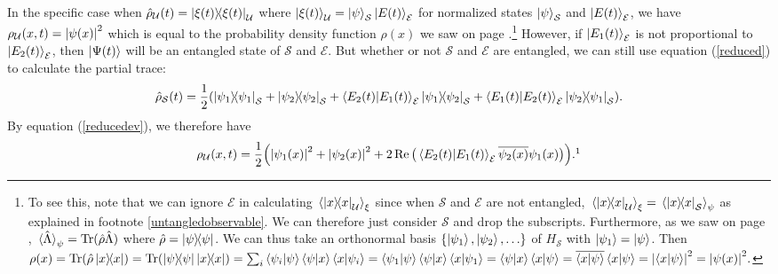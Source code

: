      In the specific case when $\hat{\rho}_\mathcal{U}(t)=\dyad{\xi(t)}_\mathcal{U}$ where $\ket{\xi(t)}_\mathcal{U}=\ket{\psi}_\mathcal{S}\ket{E(t)}_\mathcal{E}$ for normalized states $\ket{\psi}_\mathcal{S}$ and $\ket{E(t)}_\mathcal{E}$, we have $\rho_\mathcal{U}(x, t) =\abs{\psi(x)}^2$ which is equal to the probability density function $\rho(x)$ we saw on page \pageref{rhodensity}.\footnote{To see this, note that we can ignore $\mathcal{E}$ in calculating $\ev*{\dyad{x}_\mathcal{U}}_\xi$ since when $\mathcal{S}$ and $\mathcal{E}$ are not entangled, $\ev*{\dyad{x}_\mathcal{U}}_\xi = \ev*{\dyad{x}_\mathcal{S}}_\psi$ as explained in footnote \ref{untangledobservable}. We can therefore just consider $\mathcal{S}$ and drop the subscripts.
    Furthermore, as we saw on page \pageref{traceev}, $\ev*{\hat{\Lambda}}_\psi=\Tr(\hat{\rho}\hat{\Lambda})$ where $\hat{\rho}=\dyad{\psi}$. 
    We can thus take an orthonormal basis $\{\ket{\psi_1},\ket{\psi_2},\ldots\}$ of $H_\mathcal{S}$ with $\ket{\psi_1}=\ket{\psi}$. 
    Then $\rho(x)=\Tr(\hat{\rho}\dyad{x})=\Tr(\dyad{\psi}\dyad{x})=\sum_i\ip{\psi_i}{\psi}\ip{\psi}{x}\ip{x}{\psi_i}=\ip{\psi_1}{\psi}\ip{\psi}{x}\ip{x}{\psi_1} =\ip{\psi}{x}\ip{x}{\psi}=\overline{\ip{x}{\psi}}\ip{x}{\psi}=\abs{\ip{x}{\psi}}^2=\abs{\psi(x)}^2.$} 
    However, if $\ket{E_1(t)}_\mathcal{E}$ is not proportional to $\ket{E_2(t)}_\mathcal{E}$, then $\ket{\Psi(t)}$ will be an entangled state of $\mathcal{S}$ and $\mathcal{E}$. But whether or not $\mathcal{S}$ and $\mathcal{E}$ are entangled, we can still use equation (\ref{reduced}) to calculate the partial trace:
    $$\hat{\rho}_\mathcal{S}(t)=\frac{1}{2}(\dyad{\psi_1}_\mathcal{S}+\dyad{\psi_2}_\mathcal{S}+\ip{E_2(t)}{E_1(t)}_\mathcal{E} \dyad{\psi_1}{\psi_2}_\mathcal{S}+\ip{E_1(t)}{E_2(t)}_\mathcal{E} \dyad{\psi_2}{\psi_1}_\mathcal{S}).$$
    By equation (\ref{reducedev}), we therefore have
    \begin{equation}\rho_\mathcal{U}(x, t)=\frac{1}{2}\Big(\abs{\psi_1(x)}^2+\abs{\psi_2(x)}^2+2\Re\big(\ip{E_2(t)}{E_1(t)}_\mathcal{E}\overline{\psi_2(x)}\psi_1(x)\big)\Big).\protect\footnotemark
    \end{equation}
